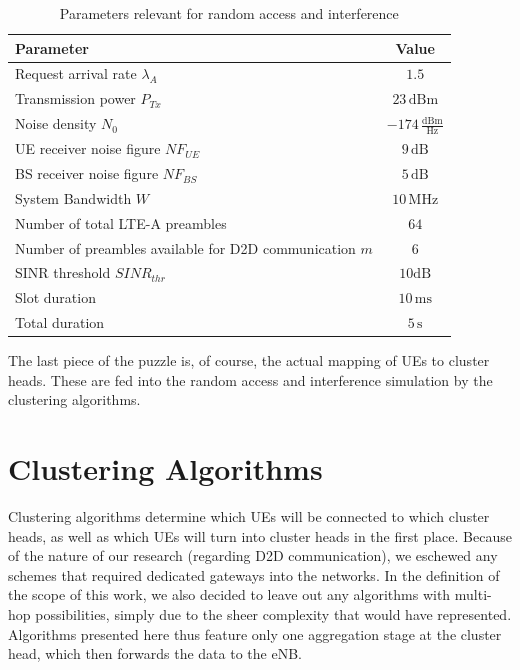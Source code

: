 \begin{table}[H]
\begin{center}
 \begin{tabular}{||p{10.5cm}|p{2.5cm}||} 
 \hline
 \textbf{Parameter} & \multicolumn{1}{|c||}{\textbf{Value}}\\
 \hline\hline
 Request arrival rate $\lambda_A$ & \multicolumn{1}{|c||}{$1.5$} \\ 
 \hline
 Transmission power $P_{Tx}$& \multicolumn{1}{|c||}{$23\,\text{dBm}$} \\
 \hline
 Noise density $N_0$ & \multicolumn{1}{|c||}{$-174\,\frac{\text{dBm}}{\text{Hz}}$}\\
 \hline
 UE receiver noise figure $NF_{UE}$ & \multicolumn{1}{|c||}{$9\,\text{dB}$}\\
 \hline
 BS receiver noise figure $NF_{BS}$ & \multicolumn{1}{|c||}{$5\,\text{dB}$} \\
 \hline
 System Bandwidth $W$ & \multicolumn{1}{|c||}{$10\,\text{MHz}$} \\
 \hline
 Number of total LTE-A preambles & \multicolumn{1}{|c||}{$64$} \\
 \hline
 Number of preambles available for D2D communication $m$& \multicolumn{1}{|c||}{$6$}\\
 \hline
 SINR threshold $SINR_{thr}$ & \multicolumn{1}{|c||}{$10\text{dB}$}\\
 \hline
 Slot duration & \multicolumn{1}{|c||}{$10\,\text{ms}$}\\
 \hline
 Total duration &\multicolumn{1}{|c||}{$5\,\text{s}$}\\
 \hline
\end{tabular}
\end{center}
\caption{Parameters relevant for random access and interference}
\label{tbl:RA}
\end{table}

The last piece of the puzzle is, of course, the actual mapping of UEs to cluster heads. These are fed into the random access and interference simulation by the clustering algorithms.

\section{Clustering Algorithms} \label{ClusteringAlgs}
Clustering algorithms determine which UEs will be connected to which cluster heads, as well as which UEs will turn into cluster heads in the first place. Because of the nature of our research (regarding D2D communication), we eschewed any schemes that required dedicated gateways into the networks. In the definition of the scope of this work, we also decided to leave out any algorithms with multi-hop possibilities, simply due to the sheer complexity that would have represented. Algorithms presented here thus feature only one aggregation stage at the cluster head, which then forwards the data to the eNB.

